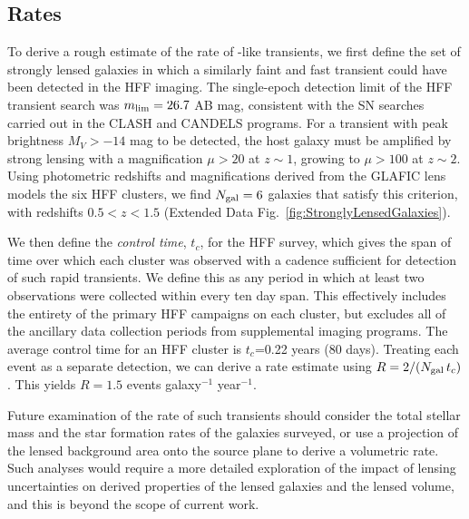 \subsection{Rates}\label{sec:RatesMethods}

To derive a rough estimate of the rate of \spock-like transients, we
first define the set of strongly lensed galaxies in which a similarly
faint and fast transient could have been detected in the HFF
imaging. The single-epoch detection limit of the HFF transient search
was $m_{\rm lim}=26.7$ AB mag, consistent with the SN searches carried
out in the CLASH and CANDELS programs\cite{Graur:2014,Rodney:2014}.
For a transient with peak brightness $M_{V}>-14$ mag to be detected,
the host galaxy must be amplified by strong lensing with a
magnification $\mu>20$ at $z\sim1$, growing to $\mu>100$ at $z\sim2$.
Using photometric redshifts and magnifications derived from the GLAFIC
lens models the six HFF clusters, we find $N_{\rm gal}=6$ galaxies
that satisfy this criterion, with redshifts $0.5<z<1.5$ (Extended Data
Fig.~\ref{fig:StronglyLensedGalaxies}).

We then define the {\it control time}, $t_{c}$, for the HFF survey,
which gives the span of time over which each cluster was observed with
a cadence sufficient for detection of such rapid transients.  We
define this as any period in which at least two \HST observations were
collected within every ten day span. This effectively includes the
entirety of the primary HFF campaigns on each cluster, but excludes
all of the ancillary data collection periods from supplemental \HST
imaging programs. The average control time for an HFF cluster is
$t_{c}$=0.22 years (80 days).  Treating each \spock event as a
separate detection, we can derive a rate estimate using $R = 2 /
(N_{\rm gal}\,t_c)$.  This yields $R=1.5$ events galaxy$^{-1}$
year$^{-1}$.   

Future examination of the rate of such transients should consider the
total stellar mass and the star formation rates of the galaxies
surveyed, or use a projection of the lensed background area onto the
source plane to derive a volumetric rate.  Such analyses would require
a more detailed exploration of the impact of lensing uncertainties on
derived properties of the lensed galaxies and the lensed volume, and
this is beyond the scope of current work.

